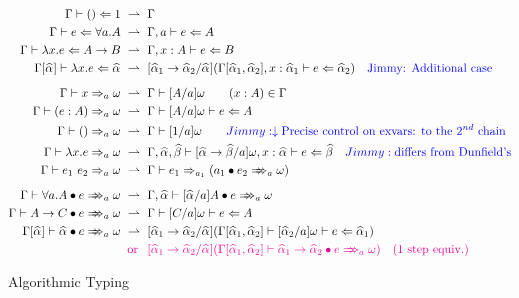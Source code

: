 \begin{figure}[t]
\begin{gather*}
\begin{aligned}
\Gm \vdash () \Lto 1 &\rto \Gm\\
\Gm \vdash e\Lto \forall a. A &\rto \Gm,a \vdash e\Lto A\\
\Gm \vdash \lambda x. e \Lto A\to B &\rto \Gm, x:A  \vdash e \Lto B\\
\Gm[\al] \vdash \lambda x. e \Lto \al &\rto [\al[1]\to \al[2] / \al](\Gm[\al[1],\al[2]], x:\al[1] \vdash e \Lto \al[2]) \quad\text{\jimmy{Additional case}}
\\[2mm]
\Gm \vdash x\To_a \jg &\rto \Gm \vdash [A/a] \jg \qquad (x:A)\in \Gm\\
\Gm \vdash (e:A)\To_a \jg &\rto \Gm \vdash [A/a]\jg \vdash e \Lto A\\
\Gm \vdash ()\To_a \jg &\rto \Gm \vdash [1/a]\jg \qquad\jimmy{\downarrow\text{Precise control on exvars: to the $2^{nd}$ chain}}\\
\Gm \vdash \lambda x. e \To_a \jg &\rto
	\Gm,\al,\bt \vdash [\al\to\bt/a]\jg, x:\al \vdash e\Lto \bt \quad\jimmy{\text{differs from Dunfield's}}\\
\Gm \vdash e_1\ e_2 \To_a \jg &\rto \Gm \vdash e_1\To_{a_1} (\appInfAlg{a_1}{e_2})
\\[2mm]
\Gm \vdash \appInfAlg{\forall a. A}{e} &\rto \Gm,\al \vdash \appInfAlg{[\al/a]A}{e}\\
\Gm \vdash \appInfAlg{A\to C}{e} &\rto \Gm \vdash [C/a]\jg \vdash e \Lto A\\
\Gm[\al] \vdash \appInfAlg{\al}{e} &\rto
	[\al[1]\to\al[2]/\al](\Gm[\al[1], \al[2]] \vdash [\al[2]/a]\jg \vdash e\Lto \al[1])\\
 &\color{magenta} \makebox[0pt]{\qquad or}\phantom{{}\rto{}}
 	[\al[1]\to\al[2]/\al](\Gm[\al[1], \al[2]] \vdash \appInfAlg{\al[1]\to\al[2]}{e}) \quad\text{(1 step equiv.)}
\end{aligned}
\end{gather*}
\caption{Algorithmic Typing}\label{fig:alg}
\end{figure}



